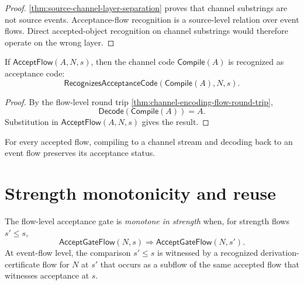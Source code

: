 \begin{proof}
\autoref{thm:source-channel-layer-separation} proves that channel substrings are not source events. Acceptance-flow recognition is a source-level relation over event flows. Direct accepted-object recognition on channel substrings would therefore operate on the wrong layer.
\end{proof}

\begin{theorem}
\label{thm:derivcert-generated-compilation-preserves-acceptance}
If $\mathsf{AcceptFlow}(A,N,s)$, then the channel code $\mathsf{Compile}(A)$ is recognized as acceptance code:
$$
  \mathsf{RecognizesAcceptanceCode}(\mathsf{Compile}(A),N,s).
$$
\end{theorem}

\begin{proof}
By the flow-level round trip \autoref{thm:channel-encoding-flow-round-trip},
$$
  \mathsf{Decode}(\mathsf{Compile}(A))=A.
$$
Substitution in $\mathsf{AcceptFlow}(A,N,s)$ gives the result.
\end{proof}

\begin{corollary}
\label{cor:derivcert-generated-acceptance-invariant}
For every accepted flow, compiling to a channel stream and decoding back to an event flow preserves its acceptance status.
\end{corollary}

\section{Strength monotonicity and reuse}
\label{sec:derivcert-generated-strength-reuse}

\begin{definition}
\label{def:derivcert-generated-strength-monotonicity}
The flow-level acceptance gate is \emph{monotone in strength} when, for strength flows $s' \leq s$,
$$
  \mathsf{AcceptGateFlow}(N,s)
  \Longrightarrow
  \mathsf{AcceptGateFlow}(N,s').
$$
At event-flow level, the comparison $s' \leq s$ is witnessed by a recognized derivation-certificate flow for $N$ at $s'$ that occurs as a subflow of the same accepted flow that witnesses acceptance at $s$.
\end{definition}

